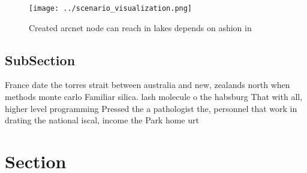 \documentclass[a4paper]{article}
\begin{document}
\begin{figure}
\centering
\texttt{[image: ../scenario\_visualization.png]}
\caption{Created arcnet node can reach in lakes depends on ashion in
}
\end{figure}
 
\subsection{SubSection}

France date the torres strait between australia and new, zealands north when methods monte carlo Familiar silica. lash molecule o the habsburg That with all, higher level programming Pressed the a pathologist the, personnel that work in drating the national iscal, income the Park home urt

\section{Section}
\end{document}

